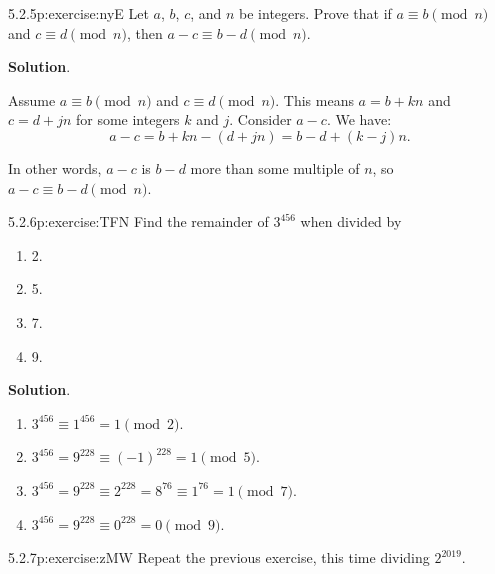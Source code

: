 \documentclass[twoside,11pt,]{book}
\newcommand{\blocktitlefont}{\relax}
\numberwithin{equation}{chapter}
\begin{document}
\begin{divisionsolution}{5.2.5}{}{p:exercise:nyE}%
Let \(a\), \(b\), \(c\), and \(n\) be integers. Prove that if \(a \equiv b \pmod{n}\) and \(c \equiv d \pmod{n}\), then \(a-c \equiv b-d \pmod{n}\).%
\par\smallskip%
\noindent\textbf{\blocktitlefont Solution}.\quad{}\begin{solutionproof}
Assume \(a \equiv b \pmod n\) and \(c \equiv d \pmod n\). This means \(a = b + kn\) and \(c = d + jn\) for some integers \(k\) and \(j\). Consider \(a-c\). We have:%
\begin{equation*}
a-c = b+kn - (d+jn) = b-d + (k-j)n\text{.}
\end{equation*}
%
\par
In other words, \(a-c\) is \(b-d\) more than some multiple of \(n\), so \(a-c \equiv b-d \pmod n\).%
\end{solutionproof}
\end{divisionsolution}%
\begin{divisionsolution}{5.2.6}{}{p:exercise:TFN}%
Find the remainder of \(3^{456}\) when divided by%
\begin{multicols}{4}
\begin{enumerate}[label=(\alph*)]
\item{}2.%
\item{}5.%
\item{}7.%
\item{}9.%
\end{enumerate}
\end{multicols}
%
\par\smallskip%
\noindent\textbf{\blocktitlefont Solution}.\quad{}%
\begin{enumerate}[label=(\alph*)]
\item{}\(3^{456} \equiv 1^{456} = 1 \pmod 2\).%
\item{}\(3^{456} = 9^{228} \equiv (-1)^{228} = 1 \pmod{5}\).%
\item{}\(3^{456} = 9^{228} \equiv 2^{228} = 8^{76} \equiv 1^{76} = 1 \pmod 7\).%
\item{}\(3^{456} = 9^{228} \equiv 0^{228} = 0 \pmod{9}\).%
\end{enumerate}
%
\end{divisionsolution}%
\begin{divisionsolution}{5.2.7}{}{p:exercise:zMW}%
Repeat the previous exercise, this time dividing \(2^{2019}\).%
\end{divisionsolution}%
\end{document}
